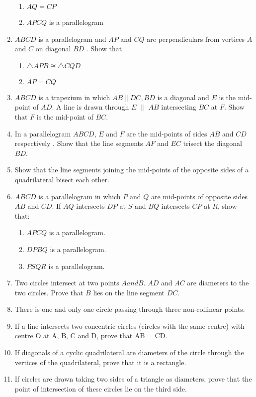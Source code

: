 \begin{enumerate}[label=\thesubsection.\arabic*.,ref=\thesubsection.\theenumi]
\begin{enumerate}
\item $AQ = CP$ 
\item $APCQ$ is a parallelogram
\end{enumerate}
\item $ABCD$ is a parallelogram and $AP$ and $CQ$ are perpendiculars from vertices $A$ and $C$ on diagonal $BD$ . Show that 
\begin{enumerate} 
\item  $\triangle  APB  \cong   \triangle  CQD $ 
\item $AP = CQ$
\end{enumerate}
\item $ABCD$ is a trapezium in which $AB  \parallel  DC, BD$ is a diagonal and $E$ is the mid-point of $AD$. A line is drawn through $E$ $\parallel$  $AB$ intersecting $BC$ at $F$. Show that $F$ is the mid-point of $BC$.
\item In a parallelogram $ABCD$, $E$ and $F$ are the mid-points of sides $AB$ and $CD$ respectively . Show that the line segments $AF$ and $EC$ trisect the diagonal $BD$.
\item Show that the line segments joining the mid-points of the opposite sides of a quadrilateral bisect each other.
\item $ABCD$ is a parallelogram in which $P$ and $Q$ are mid-points of opposite sides $AB$ and $CD$. If $AQ$ intersects $DP$ at $S$ and $BQ$ intersects $CP$ at $R$, show that: 
%
\begin{enumerate}
\item  $APCQ$ is a parallelogram. 
\item $DPBQ$ is a parallelogram. 
\item $PSQR$ is a parallelogram.
\end{enumerate}
%
\item Two circles intersect at two points $A and B$. $AD$ and $AC$ are diameters to the two circles. Prove that $B$ lies on the line segment $DC$.
\item  There is one and only one circle passing through three non-collinear points. 
\item If a line intersects two concentric circles (circles with the same centre) with centre O at A, B, C and D, prove that AB = CD.
\item If diagonals of a cyclic quadrilateral are diameters of the circle through the vertices of
the quadrilateral, prove that it is a rectangle.
\item If circles are drawn taking two sides of a triangle as diameters, prove that the point of
intersection of these circles lie on the third side.
\end{enumerate}

